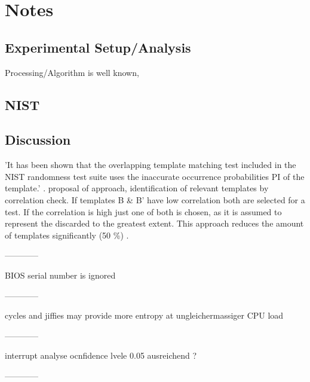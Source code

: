 \chapter{Notes}
\label{cha:notes}

\section{Experimental Setup/Analysis}
Processing/Algorithm is well known, 

\section{NIST}




\section{Discussion}

'It has been shown that the overlapping template matching test included in the NIST randomness test suite uses the inaccurate occurrence probabilities PI of the template.'
\cite{hamano2007correction,chen2016templates}. \cite{chen2016templates} proposal of approach, identification of relevant templates by correlation check. If templates B \&  B' have low correlation
both are selected for a test. If the correlation is high just one of both is chosen, as it is assumed to represent the discarded to the greatest extent. This approach reduces the amount of templates significantly (50 \%) \cite{chen2016templates}.

------------

BIOS serial number is ignored

------------

cycles and jiffies may provide more entropy at ungleichermassiger CPU load

------------

interrupt analyse ocnfidence lvele 0.05 ausreichend ?

------------
